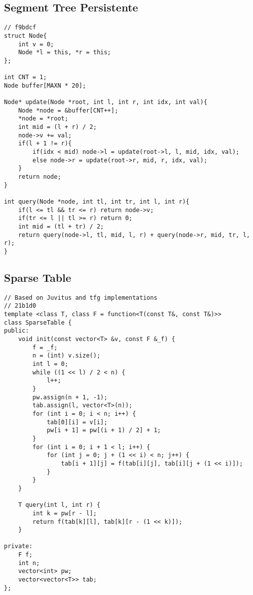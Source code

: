 \documentclass[12pt, a4paper, twoside]{article}
\begin{document}
\subsection{Segment Tree Persistente
}
\begin{lstlisting}
// f9bdcf
struct Node{
	int v = 0;
	Node *l = this, *r = this;
};

int CNT = 1;
Node buffer[MAXN * 20];
 
Node* update(Node *root, int l, int r, int idx, int val){
	Node *node = &buffer[CNT++];
	*node = *root;
	int mid = (l + r) / 2;
	node->v += val;
	if(l + 1 != r){
		if(idx < mid) node->l = update(root->l, l, mid, idx, val);
		else node->r = update(root->r, mid, r, idx, val);
	}
	return node;
}
 
int query(Node *node, int tl, int tr, int l, int r){
	if(l <= tl && tr <= r) return node->v;
	if(tr <= l || tl >= r) return 0;
	int mid = (tl + tr) / 2;
	return query(node->l, tl, mid, l, r) + query(node->r, mid, tr, l, r);
}
\end{lstlisting}

\subsection{Sparse Table
}
\begin{lstlisting}
// Based on Juvitus and tfg implementations
// 21b1d0
template <class T, class F = function<T(const T&, const T&)>>
class SparseTable {
public:
	void init(const vector<T> &v, const F &_f) {
		f = _f;
		n = (int) v.size();
		int l = 0;
		while ((1 << l) / 2 < n) {
			l++;
		}
		pw.assign(n + 1, -1);
		tab.assign(l, vector<T>(n));
		for (int i = 0; i < n; i++) {
			tab[0][i] = v[i];
			pw[i + 1] = pw[(i + 1) / 2] + 1;
		}
		for (int i = 0; i + 1 < l; i++) {
			for (int j = 0; j + (1 << i) < n; j++) {
				tab[i + 1][j] = f(tab[i][j], tab[i][j + (1 << i)]);
			}
		}
	}

	T query(int l, int r) {
		int k = pw[r - l];
		return f(tab[k][l], tab[k][r - (1 << k)]);
	}

private:
	F f;
	int n;
	vector<int> pw;
	vector<vector<T>> tab;
};
\end{lstlisting}
\end{document}
